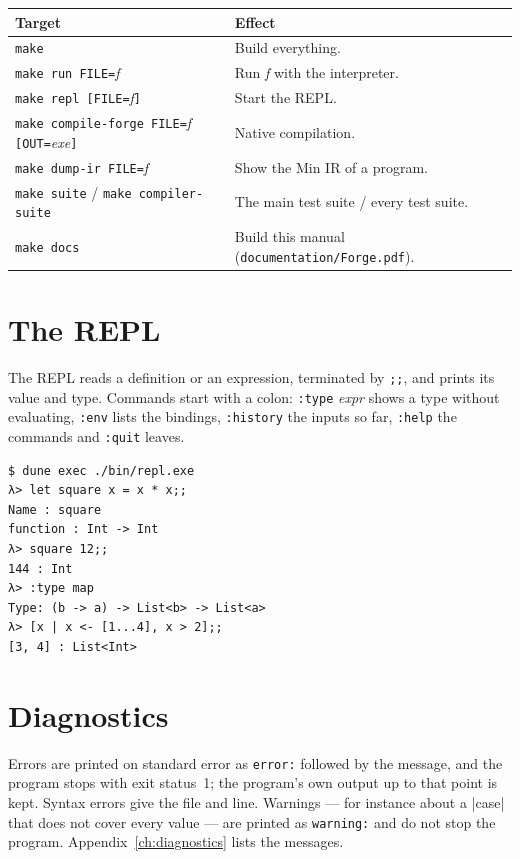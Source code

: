 \begin{center}
\small
\begin{tabularx}{\textwidth}{@{}l X@{}}
\toprule
\textbf{Target} & \textbf{Effect} \\
\midrule
\texttt{make} & Build everything. \\
\texttt{make run FILE=}\textit{f} & Run \textit{f} with the interpreter. \\
\texttt{make repl [FILE=}\textit{f}\texttt{]} & Start the REPL. \\
\texttt{make compile-forge FILE=}\textit{f} \texttt{[OUT=}\textit{exe}\texttt{]} & Native compilation. \\
\texttt{make dump-ir FILE=}\textit{f} & Show the Min IR of a program. \\
\texttt{make suite} / \texttt{make compiler-suite} & The main test suite / every test suite. \\
\texttt{make docs} & Build this manual (\texttt{documentation/Forge.pdf}). \\
\bottomrule
\end{tabularx}
\end{center}

\section{The REPL}
\label{sec:repl}

The REPL reads a definition or an expression, terminated by \texttt{;;},
and prints its value and type. Commands start with a colon:
\texttt{:type} \textit{expr} shows a type without evaluating,
\texttt{:env} lists the bindings, \texttt{:history} the inputs so far,
\texttt{:help} the commands and \texttt{:quit} leaves.

\begin{shellpanel}
\begin{lstlisting}
$ dune exec ./bin/repl.exe
λ> let square x = x * x;;
Name : square
function : Int -> Int
λ> square 12;;
144 : Int
λ> :type map
Type: (b -> a) -> List<b> -> List<a>
λ> [x | x <- [1...4], x > 2];;
[3, 4] : List<Int>
\end{lstlisting}
\end{shellpanel}

\section{Diagnostics}
\label{sec:diagnostics}

Errors are printed on standard error as \texttt{error:} followed by the
message, and the program stops with exit status~1; the program's own output
up to that point is kept. Syntax errors give the file and line. Warnings ---
for instance about a \fc|case| that does not cover every value --- are printed
as \texttt{warning:} and do not stop the program.
Appendix~\ref{ch:diagnostics} lists the messages.

